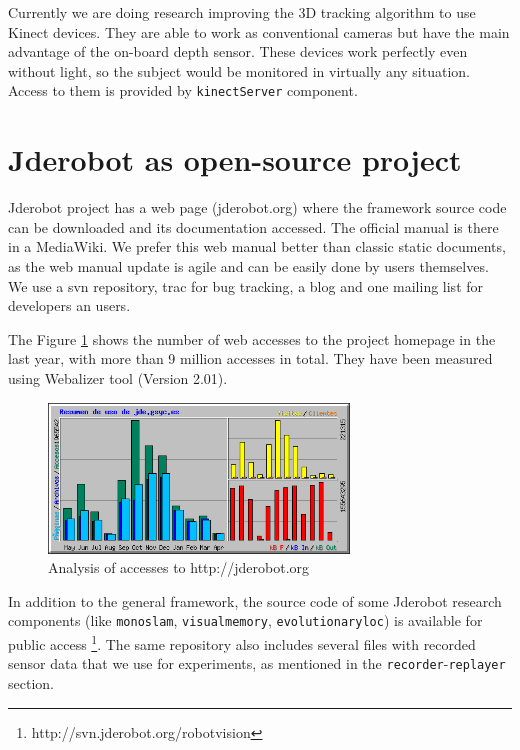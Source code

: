 \documentclass[twocolumn]{svjour3}          %
\begin{document}
Currently we are doing research improving the 3D tracking algorithm to use Kinect devices. They are able to work as conventional cameras but have the main advantage of the on-board depth sensor. These devices work perfectly even without light, so the subject would be monitored in virtually any situation. Access to them is provided by \texttt{kinectServer} component.

\section{Jderobot as open-source project}

Jderobot project has a web page (jderobot.org) where the framework source code can be downloaded and its documentation accessed. The official manual is there in a MediaWiki. We prefer this web manual better than classic static documents, as the web manual update is agile and can be easily done by users themselves. We use a svn repository, trac for bug tracking, a blog and one mailing list for developers an users.

The Figure \ref{fig:svn-wiki} shows the number of web accesses to the project homepage in the last year, with more than 9 million accesses in total. They have been measured using Webalizer tool (Version 2.01).

\begin{figure}
\begin{center}
  \includegraphics[width=8cm]{usage-jderobot-wiki.png}
\caption{Analysis of accesses to http://jderobot.org}
\end{center}
\label{fig:svn-wiki}
\end{figure}

In addition to the general framework, the source code of some Jderobot research components (like \texttt{monoslam}, \texttt{visualmemory}, \texttt{evolutionaryloc}) is available for public access \footnote{http://svn.jderobot.org/robotvision}. The same repository also includes several files with recorded sensor data that we use for experiments, as mentioned in the \texttt{recorder}-\texttt{replayer} section.
\end{document}
